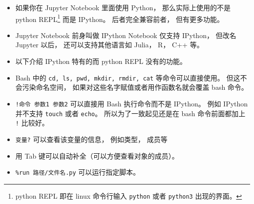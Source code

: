 
\begin{issues}
\issueDraft
\end{issues}

\begin{itemize}
\item 如果你在 Jupyter Notebook 里面使用 Python， 那么实际上使用的不是 python REPL\footnote{python REPL 即在 linux 命令行输入 \verb`python` 或者 \verb`python3` 出现的界面。} 而是 IPython。 后者完全兼容前者， 但有更多功能。
\item Jupyter Notebook 前身叫做 IPython Notebook 仅支持 IPython， 但改名 Jupyter 以后， 还可以支持其他语言如 Julia， R， C++ 等。
\item 以下介绍 IPython 特有的而 python REPL 没有的功能。
\item Bash 中的 \verb`cd, ls, pwd, mkdir, rmdir, cat` 等命令可以直接使用。 但这不会污染命名空间， 如果对这些名字赋值或者用作函数名就会覆盖 bash 命令。
\item \verb`!命令 参数1 参数2` 可以直接用 Bash 执行命令而不是 IPython。 例如 IPython 并不支持 \verb`touch` 或者 \verb`echo`。 所以为了一致起见还是在 bash 命令前面都加上 \verb`!` 比较好。
\item \verb`变量?` 可以查看该变量的信息， 例如类型， 成员等
\item 用 Tab 键可以自动补全（可以方便查看对象的成员）。
\item \verb`%run 路径/文件名.py` 可以运行指定脚本。
\end{itemize}
